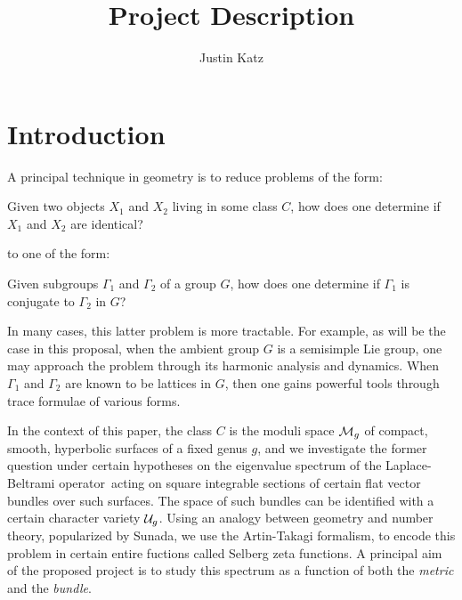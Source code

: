 \documentclass[12pt]{article}
\title{Project Description \vspace{-1 em} }
\author{Justin Katz \vspace{-1 em}}
\date{	}
\begin{document}
 
\maketitle


\section{Introduction}\label{intro}

\begin{comment}
The primary focus of my research is the spectral geometry of Riemannian mani folds, with an emphasis on the locally symmetric spaces associated to arithmetic lattices in Lie groups. My work makes essential use of geometric topology, harmonic analysis, algebraic groups, number theory, arithmetic/algebraic/differential geometry, and automorphic  forms. This topic interacts with class field theory, Galois cohomology and $K–$forms of linear algebraic g roups, Bruhat–Tits theory, and the geometry/topology of symmetric and locally symmetric spaces. It has direct connections to Riemannian geometry, geometric analysis, algebraic/arithmetic geometry, and the Langlands’ program.
\end{comment}
A principal technique in geometry  is to reduce  problems of the form:  
 
\begin{problem}\label{prob:geo}
Given two objects $X_1$ and  $X_2$ living in some class $C$, how does one determine if $X_1$ and $X_2$ are identical?
\end{problem}

to  one of the form:

\begin{problem}\label{prob:grp} 
	Given subgroups $\Gamma_1$ and $\Gamma_2$ of a group $G$, how does one determine if $\Gamma_1$ is conjugate to $\Gamma_2$ in $G$?
\end{problem}

In many cases, this latter problem is more tractable. For example, as will be the case in this proposal, when the ambient group $G$ is a semisimple Lie group, one may approach the problem through its harmonic analysis and dynamics. When $\Gamma_1$ and $\Gamma_2$ are known to be lattices in $G$, then one gains powerful tools through trace formulae of various forms.

In the context of this paper, the class $C$ is the moduli space $\mathcal{M}_g$ of
compact, smooth, hyperbolic surfaces of a fixed genus $g$,  and we investigate
the former question under certain hypotheses on the eigenvalue spectrum of the
Laplace-Beltrami operator\ acting on  square integrable sections of certain flat
vector bundles over such surfaces. The space of such bundles can be identified
with a certain character variety $\mathcal{U}_{g}$. Using an analogy between
geometry and number theory, popularized by Sunada, we use the Artin-Takagi
formalism, to encode this problem in certain entire fuctions called
Selberg zeta functions. A principal aim of the proposed project is to study this spectrum as a function
of both the \textit{metric} and the \textit{bundle}. 
\end{document}
